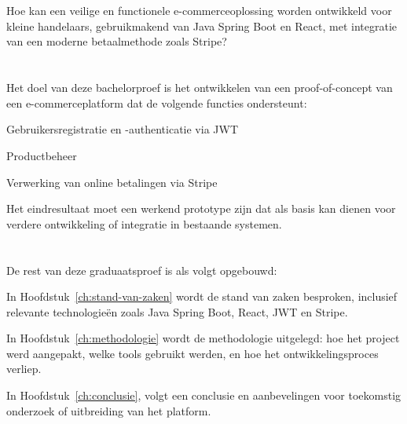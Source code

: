 \section{}%
\label{sec:onderzoeksvraag}
Hoe kan een veilige en functionele e-commerceoplossing worden ontwikkeld voor kleine handelaars, gebruikmakend van Java Spring Boot en React, met integratie van een moderne betaalmethode zoals Stripe?



\section{}%
\label{sec:onderzoeksdoelstelling}

Het doel van deze bachelorproef is het ontwikkelen van een proof-of-concept van een e-commerceplatform dat de volgende functies ondersteunt:

Gebruikersregistratie en -authenticatie via JWT

Productbeheer

Verwerking van online betalingen via Stripe

Het eindresultaat moet een werkend prototype zijn dat als basis kan dienen voor verdere ontwikkeling of integratie in bestaande systemen.



\section{}%
\label{sec:opzet-graduaatsproef}


De rest van deze graduaatsproef is als volgt opgebouwd:

In Hoofdstuk~\ref{ch:stand-van-zaken}  wordt de stand van zaken besproken, inclusief relevante technologieën zoals Java Spring Boot, React, JWT en Stripe.

In Hoofdstuk~\ref{ch:methodologie}  wordt de methodologie uitgelegd: hoe het project werd aangepakt, welke tools gebruikt werden, en hoe het ontwikkelingsproces verliep.




In Hoofdstuk~\ref{ch:conclusie}, volgt een conclusie en aanbevelingen voor toekomstig onderzoek of uitbreiding van het platform.